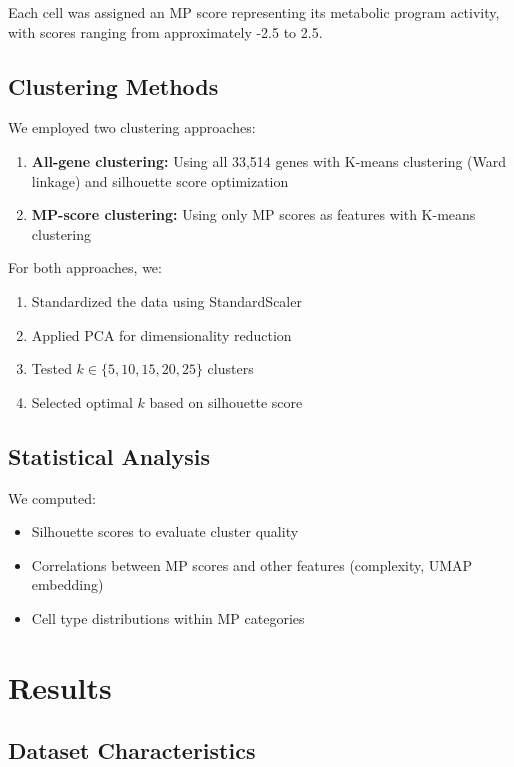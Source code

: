 \documentclass[11pt,a4paper]{article}
\begin{document}
Each cell was assigned an MP score representing its metabolic program activity, with scores ranging from approximately -2.5 to 2.5.

\subsection{Clustering Methods}

We employed two clustering approaches:
\begin{enumerate}
    \item \textbf{All-gene clustering:} Using all 33,514 genes with K-means clustering (Ward linkage) and silhouette score optimization
    \item \textbf{MP-score clustering:} Using only MP scores as features with K-means clustering
\end{enumerate}

For both approaches, we:
\begin{enumerate}
    \item Standardized the data using StandardScaler
    \item Applied PCA for dimensionality reduction
    \item Tested $k \in \{5, 10, 15, 20, 25\}$ clusters
    \item Selected optimal $k$ based on silhouette score
\end{enumerate}

\subsection{Statistical Analysis}

We computed:
\begin{itemize}
    \item Silhouette scores to evaluate cluster quality
    \item Correlations between MP scores and other features (complexity, UMAP embedding)
    \item Cell type distributions within MP categories
\end{itemize}

\section{Results}

\subsection{Dataset Characteristics}
\end{document}
